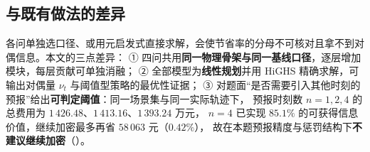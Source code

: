 \subsection{与既有做法的差异}
各问单独选口径、或用元启发式直接求解，会使节省率的分母不可核对且拿不到对偶信息。本文的三点差异：
① 四问共用\textbf{同一物理骨架与同一基线口径}，逐层增加模块，每层贡献可单独消融；
② 全部模型为\textbf{线性规划}并用 HiGHS 精确求解，可输出对偶量 \(\nu_t\) 与阈值型策略的最优性证据；
③ 对题面“是否需要引入其他时刻的预报”给出\textbf{可判定阈值}：同一场景集与同一实际轨迹下，
预报时刻数 \(n=1,2,4\) 的总费用为 \(1\,426.48\)、\(1\,413.16\)、\(1\,393.24\) 万元，
\(n=4\) 已实现 \(85.1\%\) 的可获得信息价值，继续加密最多再省 \(58\,063\) 元（\(0.42\%\)），
故在本题预报精度与惩罚结构下\textbf{不建议继续加密}（）。
